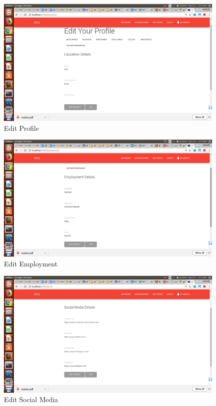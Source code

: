 \documentclass[12pt]{report}
\begin{document}
\begin{figure}[!htb]
    \centering
    \includegraphics[width=1\textwidth]{sc-3.png}
    \caption{Edit Profile}
    \label{fig:Edit Profile}
\end{figure}

\begin{figure}[!htb]
    \centering
    \includegraphics[width=1\textwidth]{sc-4.png}
    \caption{Edit Employment}
    \label{fig:Edit Employment}
\end{figure}

\begin{figure}[!htb]
    \centering
    \includegraphics[width=1\textwidth]{sc-5.png}
    \caption{Edit Social Media}
    \label{fig:Edit Social Media}
\end{figure}
\end{document}
